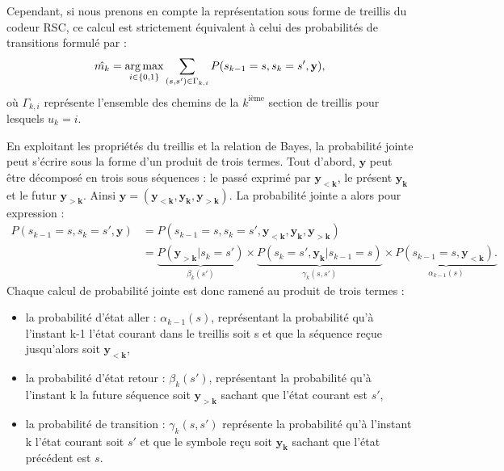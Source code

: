 Cependant, si nous prenons en compte la représentation sous forme de treillis du codeur RSC, ce calcul est strictement 
équivalent à celui des probabilités de transitions formulé par : 
\[\hat{m_k} = \operatorname*{arg\,max}_{i\in\{0,1\}} \sum\limits_{(s,s')\in\Gamma_{k,i}}P(s_{k-1}=s, s_{k}=s',\mathbf{y}),\]
où $\Gamma_{k,i}$ représente l'ensemble des chemins de la ${k^\text{ième}}$ section de treillis pour lesquels $u_k=i$. 

En exploitant les propriétés du treillis et la relation de Bayes, la probabilité jointe peut s'écrire sous la forme d'un 
produit de trois termes. Tout d'abord, $\mathbf{y}$ peut être décomposé en trois sous séquences : le passé exprimé par 
$\mathbf{y_{<k}}$, le présent $\mathbf{y_k}$ et le futur $\mathbf{y_{>k}}$. Ainsi $\mathbf{y} = (\mathbf{y_{<k}}, \mathbf{y_k}, \mathbf{y_{>k}}).$ 
La probabilité jointe a alors pour expression : 
\begin{align*}
	P(s_{k-1}=s, s_{k}=s',\mathbf{y}) & = P(s_{k-1}=s, s_{k}=s',\mathbf{y_{<k}},\mathbf{y_{k}},\mathbf{y_{>k}})                                                                                                                              \\
	                                  & = \underbrace{P(\mathbf{y_{>k}}|s_{k}=s')}_{\beta_k(s')}\times \underbrace{P(s_{k}=s',\mathbf{y_{k}}|s_{k-1}=s)}_{\gamma_k(s,s')}\times \underbrace{P(s_{k-1}=s,\mathbf{y_{<k}}).}_{\alpha_{k-1}(s)} 
\end{align*}
Chaque calcul de probabilité jointe est donc ramené au produit de trois termes :
\begin{itemize}
	\item la probabilité d'état aller : $\alpha_{k-1}(s)$, représentant la probabilité qu'à l'instant k-1 l'état courant 
	dans le treillis soit s et que la séquence reçue jusqu'alors soit $\mathbf{y_{<k}}$,
	\item la probabilité d'état retour : $\beta_k(s')$, représentant la probabilité qu'à l'instant k la future séquence 
	soit $\mathbf{y_{>k}}$ sachant que l'état courant est $s'$,
	\item la probabilité de transition : $\gamma_k(s,s')$ représente la probabilité qu'à l'instant k l'état courant soit 
	$s'$ et que le symbole reçu soit $\mathbf{y_k}$ sachant que l'état précédent est $s$.
\end{itemize}

